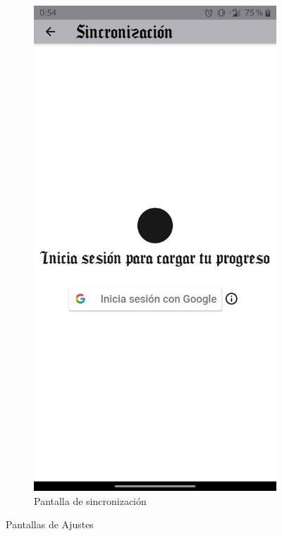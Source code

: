 \begin{figure}[H]
\begin{subfigure}[b]{0.4\linewidth}
      \label{fig:man1-10}
    \end{subfigure}
    \begin{subfigure}[b]{0.4\linewidth}
      \includegraphics[width=\linewidth]{images/man11.jpeg}
      \caption{Pantalla de sincronización}
      \label{fig:man1-11}
    \end{subfigure}
    \caption{Pantallas de Ajustes}
    \label{fig:man6}
  \end{figure}

